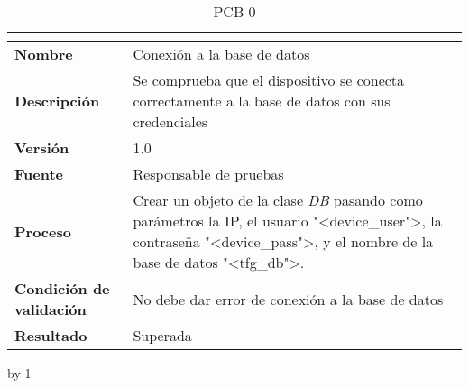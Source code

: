 \begin{table}[H]
	\caption{PCB-0\number\pcb}
	\begin{tabular}{|l|p{}|}
		\hline
		\multicolumn{2}{|c|}{\cellcolor[HTML]{BFBFBF}{\color[HTML]{000000} \textbf{PCB-0\number\pcb}}} \\ \hline
		\textbf{Nombre}                  & Conexión a la base de datos                                                                                                                                                      \\ \hline
		\textbf{Descripción}             & Se comprueba que el dispositivo se conecta correctamente a la base de datos con sus credenciales                                                                                 \\ \hline
		\textbf{Versión}                 & 1.0                                                                                                                                                                              \\ \hline
		\textbf{Fuente}                  & Responsable de pruebas                                                                                                                                                           \\ \hline
		\textbf{Proceso}                 & Crear un objeto de la clase \textit{DB} pasando como parámetros la IP, el usuario "<device\_user">, la contraseña "<device\_pass">, y el nombre de la base de datos "<tfg\_db">. \\ \hline
		\textbf{Condición de validación} & No debe dar error de conexión a la base de datos                                                                                                                                 \\ \hline
		\textbf{Resultado}               & Superada                                                                                                                                                                         \\ \hline
	\end{tabular}
\end{table}
\advance\pcb by 1
